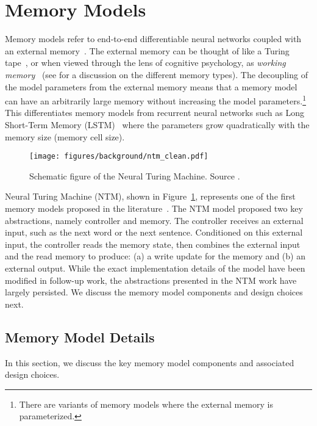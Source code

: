 \documentclass[12pt]{thesis-umich}[thesis]
\begin{document}
 
\section{Memory Models}
\label{sec:memory_model}
Memory models refer to end-to-end differentiable neural networks coupled with an external memory~\cite{graves2014neural,graves2016hybrid}. 
The external memory can be thought of like a Turing tape~\cite{turing1950mind}, or when viewed through the lens of cognitive psychology, as \emph{working memory}~\cite{baddeley1986} (see \citet{Nematzadeh2020ONMI} for a discussion on the different memory types). 
The decoupling of the model parameters from the external memory means that a memory model can have an arbitrarily large memory without increasing the model parameters.\footnote{There are variants of memory models where the external memory is parameterized.}  
This differentiates memory models from recurrent neural networks such as  Long Short-Term Memory (LSTM)~\cite{hochreiter1997long} where the parameters grow quadratically with the memory size (memory cell size). 

\begin{figure}[t]
    \centering
    \texttt{[image: figures/background/ntm\_clean.pdf]}
    \caption{Schematic figure of the Neural Turing Machine. Source \citet{graves2014neural}.}
    \label{fig:ntm}
\end{figure}

Neural Turing Machine (NTM), shown in Figure~\ref{fig:ntm}, represents one of the first memory models proposed in the literature~\cite{graves2014neural}. 
The NTM model proposed two key abstractions, namely controller and memory. 
The controller receives an external input, such as the next word or the next sentence. Conditioned on this external input, the controller reads the memory state,  then combines the external input and the read memory to produce: (a) a write update for the memory and (b) an external output. 
While the exact implementation details of the model have been modified in follow-up work, the abstractions presented in the NTM work have largely persisted. We discuss the memory model components and design choices next.  

\subsection{Memory Model Details}
In this section, we discuss the key memory model components and associated design choices. 
\end{document}
